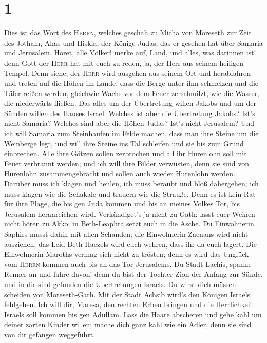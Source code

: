 \hypertarget{section}{%
\section{1}\label{section}}

 Dies ist das Wort des \textsc{Herrn}, welches geschah zu
Micha von Moreseth zur Zeit des Jotham, Ahas und Hiskia, der Könige
Judas, das er gesehen hat über Samaria und Jerusalem. 
Höret, alle Völker! merke auf, Land, und alles, was darinnen ist! denn
Gott der \textsc{Herr} hat mit euch zu reden, ja, der Herr aus seinem
heiligen Tempel.  Denn siehe, der \textsc{Herr} wird
ausgehen aus seinem Ort und herabfahren und treten auf die Höhen im
Lande,  dass die Berge unter ihm schmelzen und die Täler
reißen werden, gleichwie Wachs vor dem Feuer zerschmilzt, wie die
Wasser, die niederwärts fließen.  Das alles um der
Übertretung willen Jakobs und um der Sünden willen des Hauses Israel.
Welches ist aber die Übertretung Jakobs? Ist's nicht Samaria? Welches
sind aber die Höhen Judas? Ist's nicht Jerusalem?  Und ich
will Samaria zum Steinhaufen im Felde machen, dass man ihre Steine um
die Weinberge legt, und will ihre Steine ins Tal schleifen und sie bis
zum Grund einbrechen.  Alle ihre Götzen sollen zerbrochen
und all ihr Hurenlohn soll mit Feuer verbrannt werden; und ich will ihre
Bilder verwüsten, denn sie sind von Hurenlohn zusammengebracht und
sollen auch wieder Hurenlohn werden.  Darüber muss ich
klagen und heulen, ich muss beraubt und bloß dahergehen; ich muss klagen
wie die Schakale und trauern wie die Strauße.  Denn es ist
kein Rat für ihre Plage, die bis gen Juda kommen und bis an meines
Volkes Tor, bis Jerusalem heranreichen wird. 
Verkündiget's ja nicht zu Gath; lasst euer Weinen nicht hören zu Akko;
in Beth-Leaphra setzt euch in die Asche.  Du Einwohnerin
Saphirs musst dahin mit allen Schanden; die Einwohnerin Zaenans wird
nicht ausziehen; das Leid Beth-Haezels wird euch wehren, dass ihr da
euch lagert.  Die Einwohnerin Maroths vermag sich nicht
zu trösten; denn es wird das Unglück vom \textsc{Herrn} kommen auch bis
an das Tor Jerusalems.  Du Stadt Lachis, spanne Renner an
und fahre davon! denn du bist der Tochter Zion der Anfang zur Sünde, und
in dir sind gefunden die Übertretungen Israels.  Du wirst
dich müssen scheiden von Moreseth-Gath. Mit der Stadt Achsib wird's den
Königen Israels fehlgehen.  Ich will dir, Maresa, den
rechten Erben bringen und die Herrlichkeit Israels soll kommen bis gen
Adullam.  Lass die Haare abscheren und gehe kahl um
deiner zarten Kinder willen; mache dich ganz kahl wie ein Adler, denn
sie sind von dir gefangen weggeführt.

